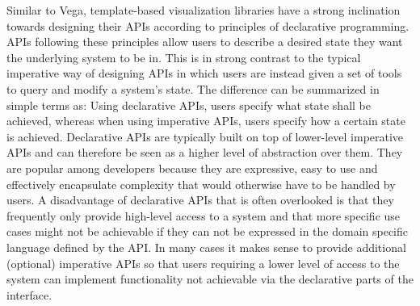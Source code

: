 Similar to Vega, template-based visualization libraries have a strong inclination towards designing their APIs according to principles of declarative programming. 
APIs following these principles allow users to describe a desired state they want the underlying system to be in. 
This is in strong contrast to the typical imperative way of designing APIs in which users are instead given a set of tools to query and modify a system's state. 
The difference can be summarized in simple terms as: Using declarative APIs, users specify what state shall be achieved, whereas when using imperative APIs, users specify how a certain state is achieved. 
Declarative APIs are typically built on top of lower-level imperative APIs and can therefore be seen as a higher level of abstraction over them. 
They are popular among developers because they are expressive, easy to use and effectively encapsulate complexity that would otherwise have to be handled by users. 
A disadvantage of declarative APIs that is often overlooked is that they frequently only provide high-level access to a system and that more specific use cases might not be achievable if they can not be expressed in the domain specific language defined by the API. 
In many cases it makes sense to provide additional (optional) imperative APIs so that users requiring a lower level of access to the system can implement functionality not achievable via the declarative parts of the interface.

